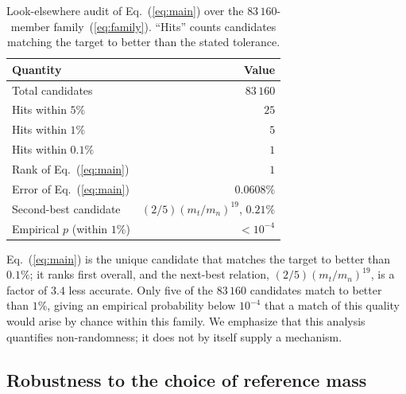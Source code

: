\documentclass[aps,prd,preprint,amsmath,amssymb,nofootinbib]{revtex4-2}
\begin{document}
\begin{table}[t]
\caption{Look-elsewhere audit of Eq.~(\ref{eq:main}) over the
$83\,160$-member family~(\ref{eq:family}). ``Hits'' counts candidates matching
the target to better than the stated tolerance.}
\label{tab:lookelsewhere}
\begin{ruledtabular}
\begin{tabular}{lr}
Quantity & Value \\
\hline
Total candidates & $83\,160$ \\
Hits within $5\%$ & $25$ \\
Hits within $1\%$ & $5$ \\
Hits within $0.1\%$ & $1$ \\
Rank of Eq.~(\ref{eq:main}) & $1$ \\
Error of Eq.~(\ref{eq:main}) & $0.0608\%$ \\
Second-best candidate & $(2/5)(m_t/m_n)^{19}$, $0.21\%$ \\
Empirical $p$ (within $1\%$) & $<10^{-4}$ \\
\end{tabular}
\end{ruledtabular}
\end{table}

Eq.~(\ref{eq:main}) is the unique candidate that matches the target to better
than $0.1\%$; it ranks first overall, and the next-best relation,
$(2/5)(m_t/m_n)^{19}$, is a factor of $3.4$ less accurate. Only five of the
$83\,160$ candidates match to better than $1\%$, giving an empirical
probability below $10^{-4}$ that a match of this quality would arise by chance
within this family. We emphasize that this analysis quantifies non-randomness;
it does not by itself supply a mechanism.

\subsection{Robustness to the choice of reference mass}
\label{sec:refmass}
\end{document}
